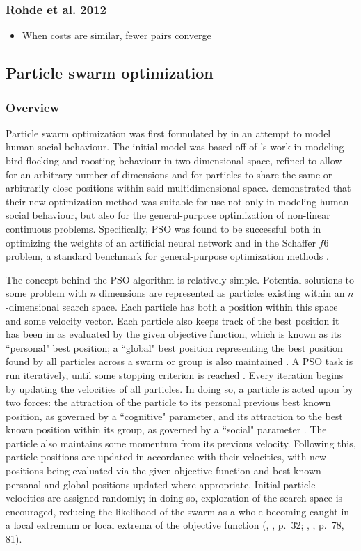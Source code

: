 \documentclass[12pt,a4paper]{article}
\newcommand{\citetwo}[4]{(\citeauthor{#1}, \citeyear{#1}, p.~#2; \citeauthor{#3}, \citeyear{#3}, p.~#4)}
\begin{document}
\subsubsection{Rohde et al. 2012}
\begin{itemize}
\item When costs are similar, fewer pairs converge
\end{itemize}


\subsection{Particle swarm optimization}
\subsubsection{Overview}
Particle swarm optimization was first formulated by \cite{kennedy1995} in an attempt to model human social behaviour. The initial model was based off of \cite{heppner1990}'s work in modeling bird flocking and roosting behaviour in two-dimensional space, refined to allow for an arbitrary number of dimensions and for particles to share the same or arbitrarily close positions within said multidimensional space. \citeauthor{kennedy1995} demonstrated that their new optimization method was suitable for use not only in modeling human social behaviour, but also for the general-purpose optimization of non-linear continuous problems. Specifically, PSO was found to be successful both in optimizing the weights of an artificial neural network and in the Schaffer $f6$ problem, a standard benchmark for general-purpose optimization methods \citep{davis1991}.

The concept behind the PSO algorithm is relatively simple. Potential solutions to some problem with $n$ dimensions are represented as particles existing within an $n$-dimensional search space. Each particle has both a position within this space and some velocity vector. Each particle also keeps track of the best position it has been in as evaluated by the given objective function, which is known as its ``personal" best position; a ``global" best position representing the best position found by all particles across a swarm or group is also maintained \citep{chong2013}. A PSO task is run iteratively, until some stopping criterion is reached \citep[p.~80]{solnon2010}. Every iteration begins by updating the velocities of all particles. In doing so, a particle is acted upon by two forces: the attraction of the particle to its personal previous best known position, as governed by a ``cognitive" parameter, and its attraction to the best known position within its group, as governed by a ``social" parameter \citep{chong2013}. The particle also maintains some momentum from its previous velocity. Following this, particle positions are updated in accordance with their velocities, with new positions being evaluated via the given objective function and best-known personal and global positions updated where appropriate. Initial particle velocities are assigned randomly; in doing so, exploration of the search space is encouraged, reducing the likelihood of the swarm as a whole becoming caught in a local extremum or local extrema of the objective function \citetwo{yang2014}{32}{solnon2010}{78, 81}. 
\end{document}
